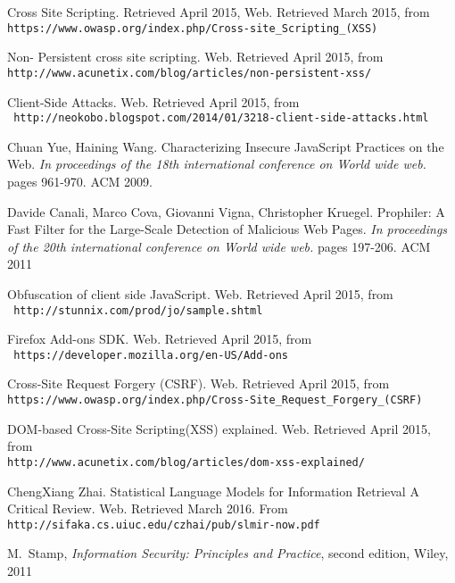 \begin{thebibliography}{10}
 Cross Site Scripting.  Retrieved April 2015, Web. Retrieved March 2015, from\\ 
 {\small\verb+https://www.owasp.org/index.php/Cross-site_Scripting_(XSS)+}

 Non- Persistent cross site scripting. Web. Retrieved April 2015, from\\
 {\small\verb+http://www.acunetix.com/blog/articles/non-persistent-xss/+}

 Client-Side Attacks. Web. Retrieved April 2015, from\\
 {\small\verb+ http://neokobo.blogspot.com/2014/01/3218-client-side-attacks.html+}

 Chuan Yue, Haining Wang. Characterizing Insecure JavaScript Practices on the Web. {\it In proceedings of the 18th international conference on World wide web.} pages 961-970. ACM 2009. 

 Davide Canali, Marco Cova, Giovanni Vigna, Christopher Kruegel. Prophiler: A Fast Filter for the Large-Scale Detection of Malicious Web Pages. {\it In proceedings of the 20th international conference on World wide web.} pages 197-206. ACM 2011 

 Obfuscation of client side JavaScript. Web. Retrieved April 2015, from\\  
 {\small\verb+ http://stunnix.com/prod/jo/sample.shtml+}

 Firefox Add-ons SDK. Web. Retrieved April 2015, from\\
 {\small\verb+ https://developer.mozilla.org/en-US/Add-ons+}

 Cross-Site Request Forgery (CSRF). Web. Retrieved April 2015, from\\
 {\small\verb+https://www.owasp.org/index.php/Cross-Site_Request_Forgery_(CSRF)+}

 DOM-based Cross-Site Scripting(XSS) explained. Web. Retrieved April 2015, from\\
 {\small\verb+http://www.acunetix.com/blog/articles/dom-xss-explained/+}

 ChengXiang Zhai. Statistical Language Models for Information Retrieval A Critical Review. Web. Retrieved March 2016. From\\
  {\small\verb+http://sifaka.cs.uiuc.edu/czhai/pub/slmir-now.pdf+}

 M.~Stamp, {\it Information Security: Principles and Practice}, second edition, 
Wiley, 2011


\end{thebibliography}
